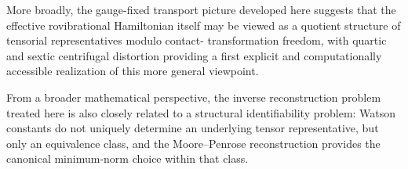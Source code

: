 More broadly, the gauge-fixed transport picture developed here suggests
that the effective rovibrational Hamiltonian itself may be viewed as a
quotient structure of tensorial representatives modulo contact-
transformation freedom, with quartic and sextic centrifugal distortion
providing a first explicit and computationally accessible realization
of this more general viewpoint.

From a broader mathematical perspective, the inverse reconstruction
problem treated here is also closely related to a structural
identifiability problem: Watson constants do not uniquely determine an
underlying tensor representative, but only an equivalence class, and
the Moore--Penrose reconstruction provides the canonical minimum-norm
choice within that class.
